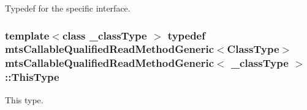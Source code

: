 Typedef for the specific interface. \hypertarget{classmts_callable_qualified_read_method_generic_ae4d162ce942aeab0d486d2aa8f001a39}{
\subsubsection[{This\-Type}]{\setlength{\rightskip}{0pt plus 5cm}template$<$class \-\_\-class\-Type $>$ typedef {\bf mts\-Callable\-Qualified\-Read\-Method\-Generic}$<${\bf Class\-Type}$>$ {\bf mts\-Callable\-Qualified\-Read\-Method\-Generic}$<$ \-\_\-class\-Type $>$\-::{\bf This\-Type}}}\label{classmts_callable_qualified_read_method_generic_ae4d162ce942aeab0d486d2aa8f001a39}
This type. 

